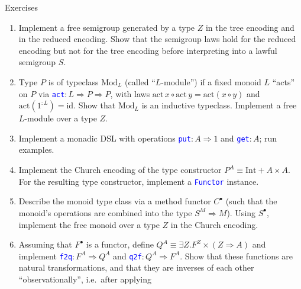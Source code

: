 \documentclass[english,,russian]{beamer}
\begin{document}
\begin{frame}{Exercises}
\begin{enumerate}
\item {\footnotesize{}\vspace{-0.2cm}Implement a free semigroup generated
by a type $Z$ in the tree encoding and in the reduced encoding. Show
that the semigroup laws hold for the reduced encoding but not for
the tree encoding before interpreting into a lawful semigroup $S$.}{\footnotesize\par}
\item {\footnotesize{}Type $P$ is of typeclass $\text{Mod}_{L}$ (called
``$L$-module'') if a fixed monoid $L$ ``acts'' on $P$ via }\texttt{\textcolor{blue}{\footnotesize{}act}}{\footnotesize{}$:L\Rightarrow P\Rightarrow P$,
with laws $\text{act}\,x\circ\text{act}\,y=\text{act}\left(x\circ y\right)$
and $\text{act}\left(1^{:L}\right)=\text{id}$. Show that $\text{Mod}_{L}$
is an inductive typeclass. Implement a free $L$-module over a type
$Z$. }{\footnotesize\par}
\item {\footnotesize{}Implement a monadic DSL with operations }\texttt{\textcolor{blue}{\footnotesize{}put}}{\footnotesize{}$:A\Rightarrow1$
and }\texttt{\textcolor{blue}{\footnotesize{}get}}{\footnotesize{}$:A$;
run examples. }{\footnotesize\par}
\item {\footnotesize{}Implement the Church encoding of the type constructor
$P^{A}\equiv\text{Int}+A\times A$. For the resulting type constructor,
implement a }\texttt{\textcolor{blue}{\footnotesize{}Functor}}{\footnotesize{}
instance.}{\footnotesize\par}
\item {\footnotesize{}Describe the monoid type class via a method functor
$C^{\bullet}$ (such that the monoid's operations are combined into
the type $S^{M}\Rightarrow M$). Using $S^{\bullet}$, implement the
free monoid over a type $Z$ in the Church encoding.}{\footnotesize\par}
\item {\footnotesize{}Assuming that $F^{\bullet}$ is a functor, define
$Q^{A}\equiv\exists Z.F^{Z}\times\left(Z\Rightarrow A\right)$ and
implement }\texttt{\textcolor{blue}{\footnotesize{}f2q}}{\footnotesize{}$:F^{A}\Rightarrow Q^{A}$
and }\texttt{\textcolor{blue}{\footnotesize{}q2f}}{\footnotesize{}$:Q^{A}\Rightarrow F^{A}$.
Show that these functions are natural transformations, and that they
are inverses of each other ``observationally'', i.e.~after applying
}
\end{enumerate}
\end{frame}
\end{document}
